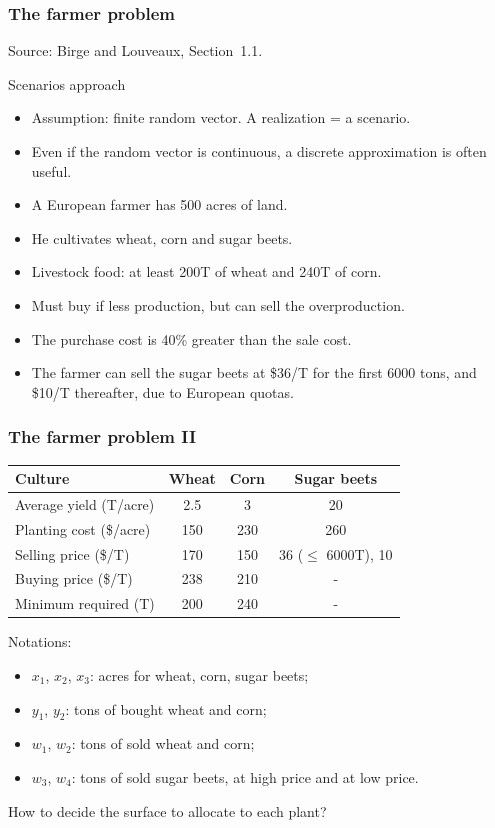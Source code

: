 \documentclass[aspectratio=169]{beamer}
\def\blue{\color{blue}}
\begin{document}
\begin{frame}
\frametitle{The farmer problem}

Source: Birge and Louveaux, Section~1.1.

\mbox{}

{\blue Scenarios approach}
\begin{itemize}
\item
Assumption: finite random vector. A realization = a scenario.
\item
Even if the random vector is continuous, a discrete approximation is often useful.
\end{itemize}

\mbox{}

\begin{itemize}
\item
A European farmer has 500 acres of land.
\item
He cultivates wheat, corn and sugar beets.
\item
Livestock food: at least 200T of wheat and 240T of corn.
\item
Must buy if less production, but can sell the overproduction.
\item
The purchase cost is 40\% greater than the sale cost.
\item
The farmer can sell the sugar beets at \$36/T for the first 6000 tons, and \$10/T thereafter, due to European quotas.
\end{itemize}

\end{frame}

\begin{frame}
\frametitle{The farmer problem II}

\begin{center}
\begin{tabular}{lccc}
\hline
Culture & Wheat & Corn & Sugar beets \\
\hline
Average yield (T/acre) & 2.5 & 3 & 20 \\
Planting cost (\$/acre) & 150 & 230 & 260 \\
Selling price (\$/T) & 170 & 150 & 36 ($\leq$ 6000T), 10 \\
Buying price (\$/T) & 238 & 210 & - \\
Minimum required (T) & 200 & 240 & - \\
\hline
\end{tabular}
\end{center}

\mbox{}

Notations:
\begin{itemize}
\item
$x_1$, $x_2$, $x_3$: acres for wheat, corn, sugar beets;
\item
$y_1$, $y_2$: tons of bought wheat and corn;
\item
$w_1$, $w_2$: tons of sold wheat and corn;
\item
$w_3$, $w_4$: tons of sold sugar beets, at high price and at low price.
\end{itemize}

\mbox{}

How to decide the surface to allocate to each plant?

\end{frame}
\end{document}
